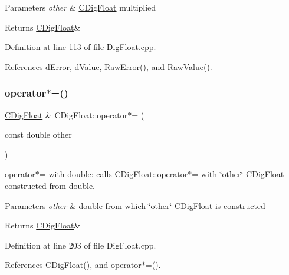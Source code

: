 \begin{DoxyParams}{Parameters}
{\em other} & \hyperlink{classCDigFloat}{C\+Dig\+Float} multiplied \\
\hline
\end{DoxyParams}
\begin{DoxyReturn}{Returns}
\hyperlink{classCDigFloat}{C\+Dig\+Float}\& 
\end{DoxyReturn}


Definition at line 113 of file Dig\+Float.\+cpp.



References d\+Error, d\+Value, Raw\+Error(), and Raw\+Value().

\mbox{\label{classCDigFloat_a9a01529fa684f7f5eb915b2d308578ea}} 
\subsubsection{\texorpdfstring{operator$\ast$=()}{operator*=()}\hspace{0.1cm}{\footnotesize\ttfamily [2/2]}}
{\footnotesize\ttfamily \hyperlink{classCDigFloat}{C\+Dig\+Float} \& C\+Dig\+Float\+::operator$\ast$= (\begin{DoxyParamCaption}\item[{const double}]{other }\end{DoxyParamCaption})}



operator$\ast$= with double\+: calls \hyperlink{classCDigFloat_a9535d47a31a3f1cfa487cc8c567a4a12}{C\+Dig\+Float\+::operator$\ast$=} with \char`\"{}other\char`\"{} \hyperlink{classCDigFloat}{C\+Dig\+Float} constructed from double. 


\begin{DoxyParams}{Parameters}
{\em other} & double from which \char`\"{}other\char`\"{} \hyperlink{classCDigFloat}{C\+Dig\+Float} is constructed \\
\hline
\end{DoxyParams}
\begin{DoxyReturn}{Returns}
\hyperlink{classCDigFloat}{C\+Dig\+Float}\& 
\end{DoxyReturn}


Definition at line 203 of file Dig\+Float.\+cpp.



References C\+Dig\+Float(), and operator$\ast$=().


